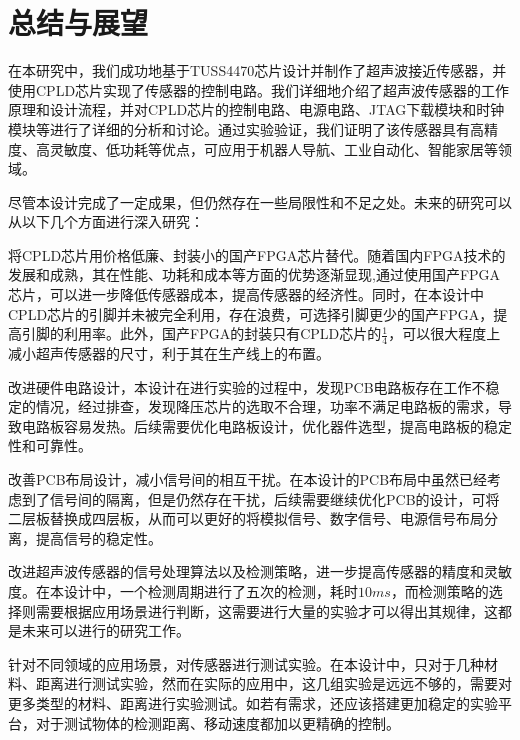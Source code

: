 \newpage
\section{总结与展望}
在本研究中，我们成功地基于TUSS4470芯片设计并制作了超声波接近传感器，并使用CPLD芯片实现了传感器的控制电路。我们详细地介绍了超声波传感器的工作原理和设计流程，并对CPLD芯片的控制电路、电源电路、JTAG下载模块和时钟模块等进行了详细的分析和讨论。通过实验验证，我们证明了该传感器具有高精度、高灵敏度、低功耗等优点，可应用于机器人导航、工业自动化、智能家居等领域。\par
尽管本设计完成了一定成果，但仍然存在一些局限性和不足之处。未来的研究可以从以下几个方面进行深入研究：\par
将CPLD芯片用价格低廉、封装小的国产FPGA芯片替代。随着国内FPGA技术的发展和成熟，其在性能、功耗和成本等方面的优势逐渐显现,通过使用国产FPGA芯片，可以进一步降低传感器成本，提高传感器的经济性。同时，在本设计中CPLD芯片的引脚并未被完全利用，存在浪费，可选择引脚更少的国产FPGA，提高引脚的利用率。此外，国产FPGA的封装只有CPLD芯片的$\frac{1}{4}$，可以很大程度上减小超声传感器的尺寸，利于其在生产线上的布置。\par
改进硬件电路设计，本设计在进行实验的过程中，发现PCB电路板存在工作不稳定的情况，经过排查，发现降压芯片的选取不合理，功率不满足电路板的需求，导致电路板容易发热。后续需要优化电路板设计，优化器件选型，提高电路板的稳定性和可靠性。\par
改善PCB布局设计，减小信号间的相互干扰。在本设计的PCB布局中虽然已经考虑到了信号间的隔离，但是仍然存在干扰，后续需要继续优化PCB的设计，可将二层板替换成四层板，从而可以更好的将模拟信号、数字信号、电源信号布局分离，提高信号的稳定性。\par
改进超声波传感器的信号处理算法以及检测策略，进一步提高传感器的精度和灵敏度。在本设计中，一个检测周期进行了五次的检测，耗时$10ms$，而检测策略的选择则需要根据应用场景进行判断，这需要进行大量的实验才可以得出其规律，这都是未来可以进行的研究工作。\par
针对不同领域的应用场景，对传感器进行测试实验。在本设计中，只对于几种材料、距离进行测试实验，然而在实际的应用中，这几组实验是远远不够的，需要对更多类型的材料、距离进行实验测试。如若有需求，还应该搭建更加稳定的实验平台，对于测试物体的检测距离、移动速度都加以更精确的控制。\par


